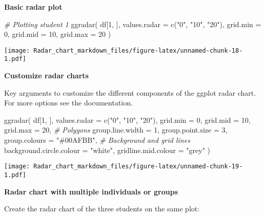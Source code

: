 \documentclass[
]{article}
\newenvironment{Shaded}{\begin{snugshade}}{\end{snugshade}}
\newcommand{\AttributeTok}[1]{\textcolor[rgb]{0.77,0.63,0.00}{#1}}
\newcommand{\CommentTok}[1]{\textcolor[rgb]{0.56,0.35,0.01}{\textit{#1}}}
\newcommand{\DecValTok}[1]{\textcolor[rgb]{0.00,0.00,0.81}{#1}}
\newcommand{\FunctionTok}[1]{\textcolor[rgb]{0.00,0.00,0.00}{#1}}
\newcommand{\NormalTok}[1]{#1}
\newcommand{\StringTok}[1]{\textcolor[rgb]{0.31,0.60,0.02}{#1}}
\begin{document}
\textbf{Basic radar plot}

\begin{Shaded}
\begin{Highlighting}[]
\CommentTok{\# Plotting student 1}
\FunctionTok{ggradar}\NormalTok{(}
\NormalTok{  df[}\DecValTok{1}\NormalTok{, ], }
  \AttributeTok{values.radar =} \FunctionTok{c}\NormalTok{(}\StringTok{"0"}\NormalTok{, }\StringTok{"10"}\NormalTok{, }\StringTok{"20"}\NormalTok{),}
  \AttributeTok{grid.min =} \DecValTok{0}\NormalTok{, }\AttributeTok{grid.mid =} \DecValTok{10}\NormalTok{, }\AttributeTok{grid.max =} \DecValTok{20}
\NormalTok{)}
\end{Highlighting}
\end{Shaded}

\texttt{[image: Radar\_chart\_markdown\_files/figure-latex/unnamed-chunk-18-1.pdf]}

\textbf{Customize radar charts}

Key arguments to customize the different components of the ggplot radar
chart. For more options see the documentation.

\begin{Shaded}
\begin{Highlighting}[]
\FunctionTok{ggradar}\NormalTok{(}
\NormalTok{  df[}\DecValTok{1}\NormalTok{, ], }
  \AttributeTok{values.radar =} \FunctionTok{c}\NormalTok{(}\StringTok{"0"}\NormalTok{, }\StringTok{"10"}\NormalTok{, }\StringTok{"20"}\NormalTok{),}
  \AttributeTok{grid.min =} \DecValTok{0}\NormalTok{, }\AttributeTok{grid.mid =} \DecValTok{10}\NormalTok{, }\AttributeTok{grid.max =} \DecValTok{20}\NormalTok{,}
  \CommentTok{\# Polygons}
  \AttributeTok{group.line.width =} \DecValTok{1}\NormalTok{, }
  \AttributeTok{group.point.size =} \DecValTok{3}\NormalTok{,}
  \AttributeTok{group.colours =} \StringTok{"\#00AFBB"}\NormalTok{,}
  \CommentTok{\# Background and grid lines}
  \AttributeTok{background.circle.colour =} \StringTok{"white"}\NormalTok{,}
  \AttributeTok{gridline.mid.colour =} \StringTok{"grey"}
\NormalTok{  )}
\end{Highlighting}
\end{Shaded}

\texttt{[image: Radar\_chart\_markdown\_files/figure-latex/unnamed-chunk-19-1.pdf]}

\textbf{Radar chart with multiple individuals or groups}

Create the radar chart of the three students on the same plot:
\end{document}
